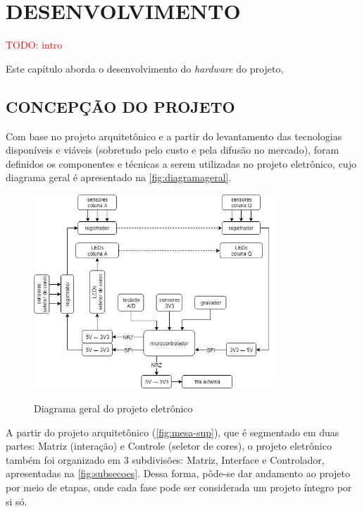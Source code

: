 
\chapter{DESENVOLVIMENTO}
\label{chap:metodologia}

\textcolor{red}{TODO: intro}

Este capítulo aborda o desenvolvimento do \emph{hardware} do projeto, 

\section{CONCEPÇÃO DO PROJETO}
\label{sec:concepcao}

Com base no projeto arquitetônico e a partir do levantamento das tecnologias disponíveis e viáveis (sobretudo pelo custo e pela difusão no mercado), foram definidos os componentes e técnicas a serem utilizadas no projeto eletrônico, cujo diagrama geral é apresentado na \autoref{fig:diagramageral}.

\begin{figure}[H]
    \centering
    \caption{Diagrama geral do projeto eletrônico}
    \includegraphics[width=0.8\textwidth]{./dados/figuras/diagrama}
    \label{fig:diagramageral}
\end{figure}

A partir do projeto arquitetônico (\autoref{fig:mesa-sup}), que é segmentado em duas partes: Matriz (interação) e Controle (seletor de cores), o projeto eletrônico também foi organizado em 3 subdivisões: Matriz, Interface e Controlador, apresentadas na \autoref{fig:subsecoes}. Dessa forma, pôde-se dar andamento ao projeto por meio de etapas, onde cada fase pode ser considerada um projeto íntegro por si só.

